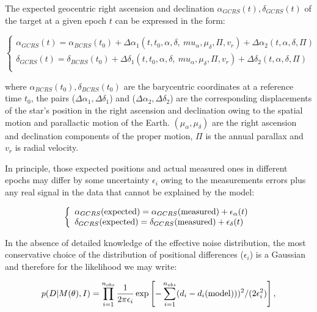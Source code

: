 \documentclass[12pt,preprint]{aastex}
\begin{document}
The  expected geocentric  right  ascension  and
declination  $\alpha_{GCRS}(t),\delta_{GCRS}(t)$ of the target at a
given epoch $t$ can be expressed in the form:

\begin{equation} \left
\{ 
\begin{array}{ll}
\label{eqs}
   \alpha_{GCRS}(t)  =  \alpha_{BCRS}(t_0) + \Delta\alpha_1(t,t_0,\alpha,\delta,\
mu_{\alpha},\mu_{\delta},\Pi,v_r) + \Delta\alpha_2(t,\alpha,\delta,\Pi) \\
   \delta_{GCRS}(t)  =  \delta_{BCRS}(t_0) + \Delta\delta_1(t,t_0,\alpha,\delta,\
mu_{\alpha},\mu_{\delta},\Pi,v_r) + \Delta\delta_2(t,\alpha,\delta,\Pi) \\
\end{array}
\right. \end{equation}

\noindent
where  $\alpha_{BCRS}(t_0),  \delta_{BCRS}(t_0)$  are  the
barycentric coordinates at  a reference time  $t_0$, the pairs
($\Delta\alpha_1,\Delta\delta_1$) and  ($\Delta\alpha_2,\Delta\delta_2$)
are the corresponding  displacements of the star's position in the 
right  ascension  and declination owing to the spatial motion and 
parallactic motion of the Earth. 
$(\mu_{\alpha},\mu_{\delta})$  are  the right  ascension  and
declination  components  of the   proper motion,  $\Pi$ is the
annual parallax and $v_r$ is radial velocity.

In principle, those expected positions and actual measured ones in different
epochs
may differ by some uncertainty $\epsilon_i$ owing to the measurements errors
plus any real signal in the data that cannot be explained by the model:

\begin{equation} 
\left
\{ 
\begin{array}{ll}
\label{eqs2}
   \alpha_{GCRS}({\rm expected})=\alpha_{GCRS}({\rm measured}) +\epsilon_{\alpha}(t) \\
   \delta_{GCRS}({\rm expected})=\delta_{GCRS}({\rm measured}) +\epsilon_{\delta}(t) 
\end{array}
\right. 
\end{equation}

In the absence of detailed knowledge of the effective noise distribution, 
the most conservative choice of the distribution of positional differences
($\epsilon_i$) 
is a Gaussian and therefore for the likelihood we may write:

\begin{equation} 
\label{eqs3}
   p(D|M(\theta),I)=\prod_{i=1}^{n_{obs}}\frac{1}{2\pi\epsilon_i}\exp\left[-\sum_{i=1}^{n_{obs
}}(d_i-d_i({\rm model})))^2/(2\epsilon_i^2)\right],
\end{equation}
\end{document}
